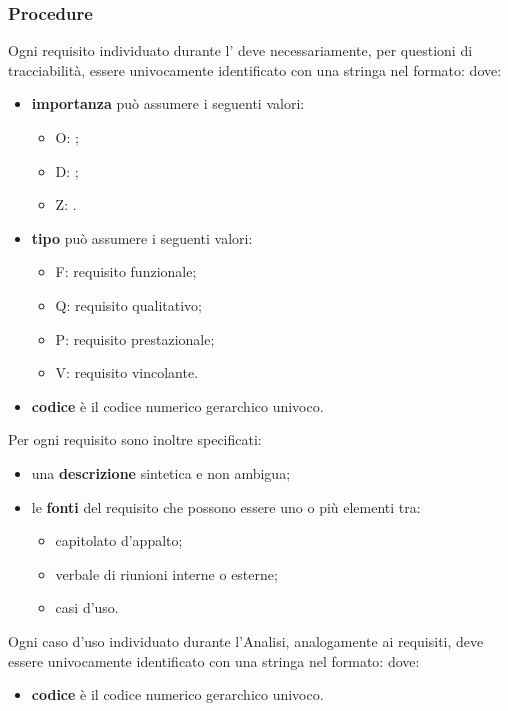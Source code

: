 \documentclass[a4paper, titlepage]{article}
\begin{document}
\subsubsection{Procedure}

Ogni requisito individuato durante l' deve necessariamente, per questioni di tracciabilità, essere univocamente identificato con una stringa nel formato:
dove:
\begin{itemize}
\item \textbf{importanza} può assumere i seguenti valori:
	\begin{itemize}
	\item O: ;
	\item D: ;
	\item Z: .
	\end{itemize}
\item \textbf{tipo} può assumere i seguenti valori:
	\begin{itemize}
	\item F: requisito funzionale;
	\item Q: requisito qualitativo;
	\item P: requisito prestazionale;
	\item V: requisito vincolante.
	\end{itemize}
\item \textbf{codice} è il codice numerico gerarchico univoco.
\end{itemize}

Per ogni requisito sono inoltre specificati:
\begin{itemize}
\item una \textbf{descrizione} sintetica e non ambigua;
\item le \textbf{fonti} del requisito che possono essere uno o più elementi tra:
	\begin{itemize}
	\item capitolato d'appalto;
	\item verbale di riunioni interne o esterne;
	\item casi d'uso.
	\end{itemize}
\end{itemize}

Ogni caso d'uso individuato durante l'Analisi, analogamente ai requisiti, deve essere univocamente identificato con una stringa nel formato:
dove:
\begin{itemize}
\item \textbf{codice} è il codice numerico gerarchico univoco.
\end{itemize}
\end{document}
